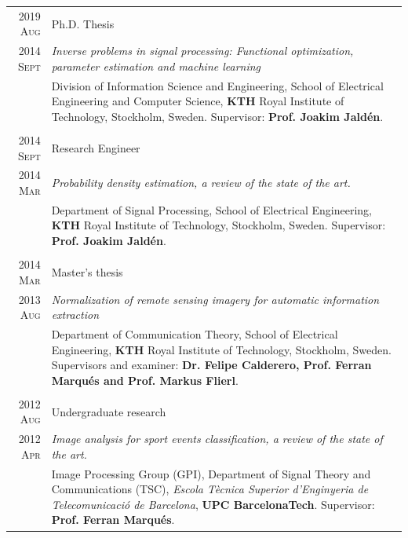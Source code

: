\documentclass[a4paper,10pt]{article}
\begin{document}
    \begin{tabular}{r|p{13cm}}
    
      \textsc{2019 Aug} 	& Ph.D. Thesis \\
      \textsc{2014 Sept} 	& \emph{Inverse problems in signal processing: Functional optimization, parameter estimation and machine learning} \\
				& \footnotesize{ Division of Information Science and Engineering, School of Electrical Engineering and Computer Science,
				  \textbf{KTH} Royal Institute of Technology, Stockholm, Sweden. Supervisor: \textbf{Prof. Joakim Jald\'{e}n}.} \\
      \multicolumn{2}{c}{} \\

      \textsc{2014 Sept} 	& Research Engineer \\
      \textsc{2014 Mar} 	& \emph{Probability density estimation, a review of the state of the art.} \\ 
				& \footnotesize{Department of Signal Processing, School of Electrical Engineering,
				  \textbf{KTH} Royal Institute of Technology, Stockholm, Sweden. Supervisor: \textbf{Prof. Joakim Jald\'{e}n}.} \\
      \multicolumn{2}{c}{} \\

      \textsc{2014 Mar} 	& Master's thesis \\
      \textsc{2013 Aug} 	& \emph{ Normalization of remote sensing imagery for automatic information extraction } \\ 
				& \footnotesize{Department of Communication Theory, School of Electrical Engineering,
				  \textbf{KTH} Royal Institute of Technology, Stockholm, Sweden. Supervisors and examiner: \textbf{Dr. Felipe Calderero, Prof. Ferran Marqu\'{e}s and Prof. Markus Flierl}.} \\
      \multicolumn{2}{c}{} \\


      \textsc{2012 Aug} 	& Undergraduate research \\
      \textsc{2012 Apr} 	& \emph{Image analysis for sport events classification, a review of the state of the art.} \\ 
				& \footnotesize{Image Processing Group (GPI), Department of Signal Theory and 
				  Communications (TSC), \emph{Escola T\`{e}cnica Superior d'Enginyeria de Telecomunicaci\'{o} 
				  de Barcelona}, \textbf{UPC BarcelonaTech}. Supervisor: \textbf{Prof. Ferran Marqu\'{e}s}.} \\

    \end{tabular}
\end{document}
